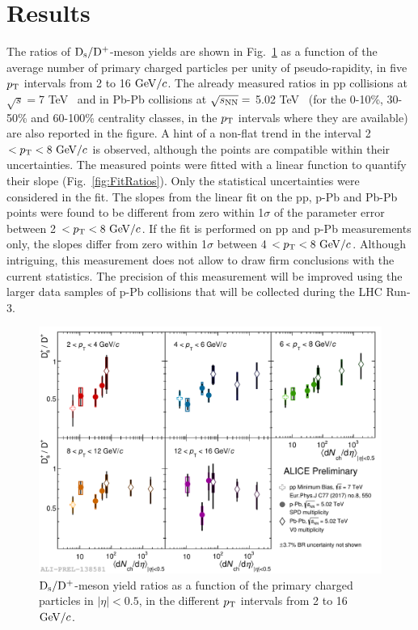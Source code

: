 \section{Results}
\label{sec:results}
The ratios of ${\rm D_s}/{\rm D^+}$-meson yields are shown in Fig.~\ref{fig:DsDplusRatios} as a function of
the average number of primary charged particles per unity of pseudo-rapidity, 
in five $p_{\rm T}$ intervals from 2 to 16 $\mathrm{GeV}/c$.
The already measured ratios in pp collisions at $\sqrt{s}=$7 TeV~\cite{Acharya:2017jgo} and 
in Pb-Pb collisions at $\sqrt{s_{\rm NN}}=$ 5.02 TeV~\cite{ALICE-PUBLIC-2017-003}
(for the 0-10\%, 30-50\% and 60-100\% centrality classes, in the 
$p_{\rm T}$ intervals where they are available) are also reported in the figure.
A hint of a non-flat trend in the interval 2 $< p_{\rm T} < 8~\mathrm{GeV}/c$ is observed, although 
the points are compatible within their uncertainties. The measured points were 
fitted with a linear function to quantify their slope (Fig.~\ref{fig:FitRatios}). Only the statistical 
uncertainties were considered in the fit. The slopes from the linear fit on the pp, 
p-Pb and Pb-Pb points were found to be different from zero within 
1$\sigma$ of the parameter error between 2 $< p_{\rm T} < 8 ~\mathrm{GeV}/c$. 
If the fit is performed on pp and p-Pb measurements only, the slopes differ from zero within 1$\sigma$ 
between 4 $< p_{\rm T} < 8 ~\mathrm{GeV}/c$. Although intriguing, this measurement does
not allow to draw firm conclusions with the current statistics.
The precision of this measurement will be improved using the 
larger data samples of p-Pb collisions that will be collected during the LHC Run-3.



\begin{figure}[h!]
    \begin{center}
          \includegraphics[width=1\textwidth]{./FigCap6/DsOverDplusVsMult_pp_pPb_PbPb.pdf}
    \end{center}
    \caption{ ${\rm D_s}/{\rm D^+}$-meson yield ratios as a function of the primary charged particles in $|\eta|<0.5$, in the different $p_{\rm T}$ intervals from 2 to 16 $\mathrm{GeV}/c$.}
    \label{fig:DsDplusRatios}
\end{figure}

